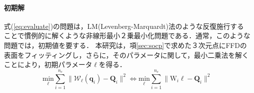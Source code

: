 \documentclass[10.5pt,twocolumn,a4j,fleqn]{ujarticle}
\def\eqref#1{式(\ref{#1})}
\begin{document}
\paragraph{初期解}
\eqref{eq:evaluate}の問題は，LM(Levenberg-Marquardt)法のような反復施行することで慣例的に解くような非線形最小２乗最小化問題である．通常，このような問題では，初期値を要する．
本研究は，項\ref{sec:socp}で求めた３次元点にFFDの表面をフィッティングし，さらに，そのパラメータに関して，最小二乗法を解くことにより，初期パラメータ$\bm{\ell}$を得る．
\begin{equation}
    \underset{\bm{\ell}} {\text{min}} {\sum_{i=1}^{n_c}\|\mathcal{W}_{\bm{\ell}}(\mathrm{\bm{q}}_i)-\bm{Q}_i\|^2} \iff \underset{\bm{\ell}} {\text{min}} {\sum_{i=1}^{n_c}\|\mathrm{W}_i\bm{\ell}-\bm{Q}_i\|^2}
\end{equation}

\end{document}
